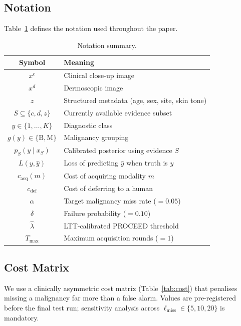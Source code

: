 \documentclass[conference]{IEEEtran}
\newcommand{\1}{\mathbf{1}}
\begin{document}
\subsection{Notation}

Table~\ref{tab:notation} defines the notation used throughout the paper.

\begin{table}[H]
  \centering
  \caption{Notation summary.}
  \label{tab:notation}
  \renewcommand{\arraystretch}{1.15}
  \small
  \begin{tabular}{cl}
    \toprule
    \textbf{Symbol} & \textbf{Meaning} \\
    \midrule
    $x^c$ & Clinical close-up image \\
    $x^d$ & Dermoscopic image \\
    $z$   & Structured metadata (age, sex, site, skin tone) \\
    $S \subseteq \{c, d, z\}$ & Currently available evidence subset \\
    $y \in \{1,\ldots,K\}$ & Diagnostic class \\
    $g(y) \in \{\text{B}, \text{M}\}$ & Malignancy grouping \\
    $p_S(y \mid x_S)$ & Calibrated posterior using evidence $S$ \\
    $L(y, \hat{y})$ & Loss of predicting $\hat{y}$ when truth is $y$ \\
    $c_{\text{acq}}(m)$ & Cost of acquiring modality $m$ \\
    $c_{\text{def}}$ & Cost of deferring to a human \\
    $\alpha$ & Target malignancy miss rate ($= 0.05$) \\
    $\delta$ & Failure probability ($= 0.10$) \\
    $\hat{\lambda}$ & LTT-calibrated PROCEED threshold \\
    $T_{\max}$ & Maximum acquisition rounds ($= 1$) \\
    \bottomrule
  \end{tabular}
\end{table}

\subsection{Cost Matrix}

We use a clinically asymmetric cost matrix (Table~\ref{tab:cost}) that
penalises missing a malignancy far more than a false alarm. Values are
pre-registered before the final test run; sensitivity analysis across
$\ell_{\text{miss}} \in \{5,10,20\}$ is mandatory.
\end{document}
